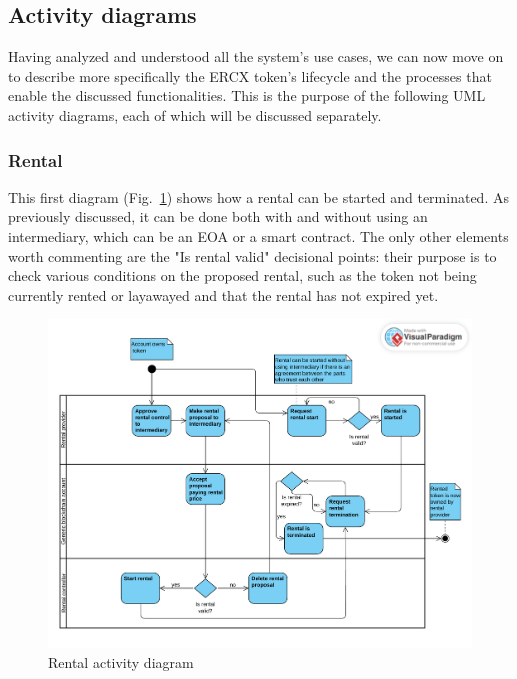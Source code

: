 \documentclass[english, LaM, oneside]{sapthesis}%
\begin{document}
\subsection{Activity diagrams}
Having analyzed and understood all the system's use cases, we can now move on to describe more specifically the ERCX token's lifecycle and the processes that enable the discussed functionalities. This is the purpose of the following UML activity diagrams, each of which will be discussed separately.

\subsubsection{Rental}

This first diagram (Fig.~\ref{fig:Rental AD}) shows how a rental can be started and terminated. As previously discussed, it can be done both with and without using an intermediary, which can be an EOA or a smart contract. The only other elements worth commenting are the "Is rental valid" decisional points: their purpose is to check various conditions on the proposed rental, such as the token not being currently rented or layawayed and that the rental has not expired yet. 

\begin{figure}[H]
    \centering
        \begin{adjustbox}{width=1\textwidth}
            \includegraphics{ActivityDiagrams/activity_rental.pdf} 
        \end{adjustbox}
    \caption{Rental activity diagram}
    \label{fig:Rental AD}
\end{figure}
\end{document}
